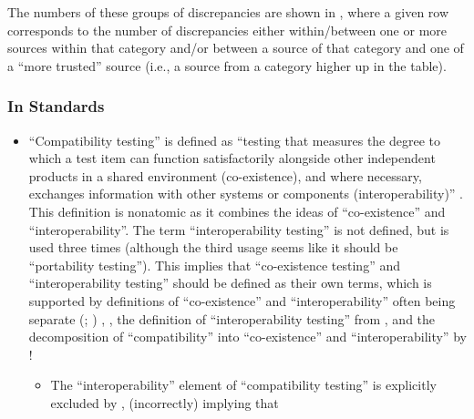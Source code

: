 The numbers of these groups of discrepancies are shown in
, where a given row corresponds to the number of
discrepancies either within/between one or more sources within that category
and/or between a source of that category and one of a ``more trusted'' source
(i.e., a source from a category higher up in the table).

\minorDiscrepsTable{}

\subsubsection{In Standards} %

\begin{itemize}
      \item ``Compatibility testing'' is defined as ``testing that measures the
            degree to which a test item can function satisfactorily alongside
            other independent products in a shared environment (co-existence),
            and where necessary, exchanges information with other systems or
            components (interoperability)'' \citep[p.~3]{IEEE2022}. This
            definition is nonatomic as it combines the ideas of ``co-existence''
            and ``interoperability''. The term ``interoperability testing'' is
            not defined, but is used three times \citep[pp.~22,~43]{IEEE2022}
            (although the third usage seems like it should be ``portability
            testing''). This implies that ``co-existence testing'' and
            ``interoperability testing'' should be defined as their own terms,
            which is supported by definitions of ``co-existence'' and
            ``interoperability'' often being separate
            \ifnotpaper
                  (\citealpISTQB{}; \citealp[pp.~73,~237]{IEEE2017})%
            \else
                  \cite[pp.~73,~237]{IEEE2017}, \cite{ISTQB}%
            \fi, the definition of
            ``interoperability testing'' from \citet[p.~238]{IEEE2017},
            and the decomposition of ``compatibility'' into ``co-existence''
            and ``interoperability'' by \citet{ISO_IEC2023a}!
            \begin{itemize}
                  \item The ``interoperability'' element of ``compatibility
                        testing'' is explicitly excluded by
                        \citet[p.~37]{IEEE2021}, (incorrectly) implying that

\end{itemize}
\end{itemize}
